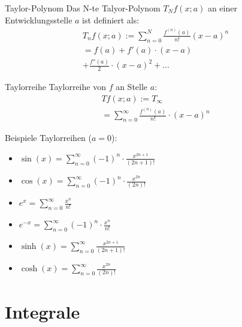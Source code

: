 \documentclass[a4paper,10pt]{article}
\def\sumn{\sum_{n=0}^\infty}
\begin{document}
\begin{subbox}{Taylor-Polynom}
 Das N-te Talyor-Polynom $T_N f(x; a)$ an einer Entwicklungsstelle $a$ ist definiert als:
 \begin{multline*}
    T_n f(x; a) := \sum_{n=0}^{N} \frac{f^{(n)} (a)}{n!} (x - a)^n \\
    = f(a) + f'(a) \cdot (x-a) \\
    + \frac{f''(a)}{2} \cdot (x - a)^2 + \ldots
 \end{multline*}
\end{subbox}

\begin{mainbox}{Taylorreihe}
 Taylorreihe von $f$ an Stelle $a$:
 \begin{multline*}
     Tf(x;a) := T_\infty \\
     = \sumn \frac{f^{(n)}(a)}{n!} \cdot (x-a)^n
 \end{multline*}
\end{mainbox}
Beispiele Taylorreihen ($a = 0$):
\begin{itemize}
 \item $\sin(x) = \sumn (-1)^n \cdot \frac{x^{2n+1}}{(2n+1)!}$
 \item $\cos(x) = \sumn (-1)^n \cdot \frac{x^{2n}}{(2n)!}$
 \item $e^x = \sumn \frac{x^n}{n!}$
 \item $e^{-x} = \sumn (-1)^n \cdot \frac{x^n}{n!}$
 \item $\sinh(x) = \sumn \frac{x^{2n+1}}{(2n+1)!}$
 \item $\cosh(x) = \sumn \frac{x^{2n}}{(2n)!}$
\end{itemize}

\section{Integrale}
\end{document}
